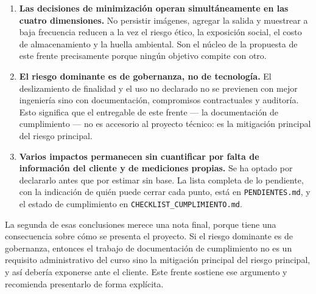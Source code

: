 \begin{enumerate}[leftmargin=1.6em,itemsep=0.4em]
  \item \textbf{Las decisiones de minimización operan simultáneamente en
        las cuatro dimensiones.} No persistir imágenes, agregar la salida
        y muestrear a baja frecuencia reducen a la vez el riesgo ético,
        la exposición social, el costo de almacenamiento y la huella
        ambiental. Son el núcleo de la propuesta de este frente
        precisamente porque ningún objetivo compite con otro.
  \item \textbf{El riesgo dominante es de gobernanza, no de tecnología.}
        El deslizamiento de finalidad y el uso no declarado no se
        previenen con mejor ingeniería sino con documentación,
        compromisos contractuales y auditoría. Esto significa que el
        entregable de este frente --- la documentación de cumplimiento
        --- no es accesorio al proyecto técnico: es la mitigación
        principal del riesgo principal.
  \item \textbf{Varios impactos permanecen sin cuantificar por falta de
        información del cliente y de mediciones propias.} Se ha optado
        por declararlo antes que por estimar sin base. La lista completa
        de lo pendiente, con la indicación de quién puede cerrar cada
        punto, está en \texttt{PENDIENTES.md}, y el estado de cumplimiento
        en \texttt{CHECKLIST\_\allowbreak CUMPLIMIENTO.md}.
\end{enumerate}

La segunda de esas conclusiones merece una nota final, porque tiene una
consecuencia sobre cómo se presenta el proyecto. Si el riesgo dominante
es de gobernanza, entonces el trabajo de documentación de cumplimiento no
es un requisito administrativo del curso sino la mitigación principal del
riesgo principal, y así debería exponerse ante el cliente. Este frente
sostiene ese argumento y recomienda presentarlo de forma explícita.

